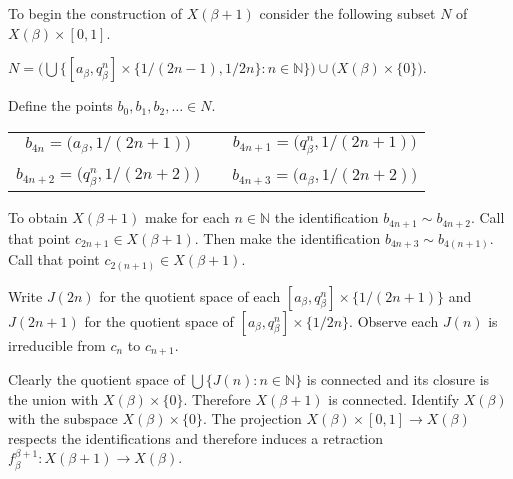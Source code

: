 \documentclass[12pt]{article}
\theoremstyle{plain}
\theoremstyle{definition}
\newcommand{\B}{\ensuremath{\beta}}
\newcommand{\NN}{\ensuremath{\mathbb N}}
\newcommand{\0}{\ensuremath{\varnothing}}
\begin{document}
	To begin the construction of $X(\B+1)$ consider the following subset $N$ of $X(\B) \times [0,1]$.
	
	\begin{center}
		$N =  \big( \bigcup \big \{ [a_\B,q^n_\B] \times \{1/(2n-1),1/2n\} : n \in \NN \big \} \big ) \cup \big ( X(\B) \times \{0\} \big )$.
	\end{center}
	
	Define the points $b_0,b_1,b_2,\ldots \in N$.
	
	
	
	\begin{center}
		\begin{tabular}{ c c c }
			$b_{4n} = \big (a_\B, 1/(2n+1) \big )$ &  & $ b_{4n+1} = \big (q^{n}_\B, 1/(2n+1) \big )$ \\ 
			&  & \\  
			$b_{4n+2} = \big (q^{n}_\B, 1/(2n+2) \big )$ &  & $b_{4n+3} = \big (a_\B, 1/(2n+2) \big ) $  
		\end{tabular}
	\end{center}
	
	
	To obtain $X(\B+1)$ make for each $n \in \NN$ the identification $b_{4n+1} \sim b_{4n+2}$.
	Call that point $c_{2n+1} \in X(\B+1)$.
	Then make the identification $b_{4n+3} \sim b_{4(n+1)}$.
	Call that point $c_{2(n+1)} \in X(\B+1)$.
	
	
	Write $J({2n})$ for the quotient space of each $[a_\B,q^n_\B] \times \{1/(2n+1)\}$
	and $J({2n+1})$ for the quotient space of $[a_\B,q^n_\B] \times \{1/2n\}$. 
	Observe each $J(n)$ is irreducible from $c_{n}$ to $ c_{n+1}$.
	
	Clearly the quotient space of $\bigcup\{J(n): n \in \NN\}$
	is connected and its closure is the union with $X(\B) \times \{0\}$.
	Therefore $X(\B+1)$ is connected.
	Identify $X(\B)$ with the subspace $X(\B) \times \{0\}$.
	The projection $X(\B) \times [0,1] \to X(\B)$ respects the identifications
	and therefore induces a retraction $f^{\B+1}_\B: X(\B+1) \to X(\B)$.
	
\end{document}
